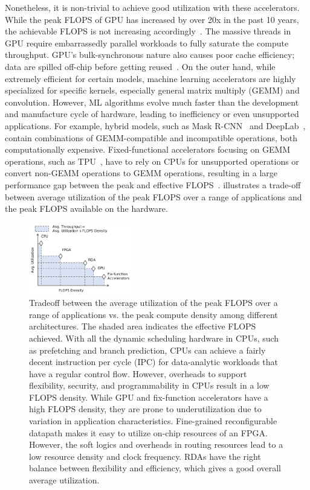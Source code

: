 Nonetheless, it is non-trivial to achieve good utilization with these accelerators.
While the peak FLOPS of GPU has increased by over 20x in the past 10 years, the achievable FLOPS is
not increasing accordingly~\cite{floptrend, gpuperfana}.
The massive threads in GPU require embarrassedly parallel workloads to fully saturate the compute
throughput. GPU's bulk-synchronous nature also causes poor cache efficiency; data are spilled
off-chip before getting reused~\cite{gpuinefficiency}.
On the outer hand, 
while extremely efficient for certain models, machine learning accelerators are highly
specialized for specific kernels, especially general matrix multiply (GEMM) and convolution.
However, ML algorithms evolve much faster than the development and manufacture cycle of hardware, 
leading to inefficiency or even unsupported applications.
For example, hybrid models, such as Mask R-CNN~\cite{maskrcnn} and DeepLab~\cite{deeplab}, contain
combinations of GEMM-compatible and incompatible operations, both computationally expensive.
Fixed-functional accelerators focusing on GEMM operations, such as TPU~\cite{tpu}, 
have to rely on CPUs for unsupported operations or
convert non-GEMM operations to GEMM operations, resulting in a large performance gap between the
peak and effective FLOPS~\cite{effflexdnnaccel}.
 illustrates a trade-off between average utilization of the peak FLOPS over a range
of applications and the peak FLOPS available on the hardware.

\begin{figure}
\centering
\includegraphics[width=0.4\textwidth]{figs/peakutil.pdf}
\caption[Average utilization vs. peak compute density trade-off]{
 Tradeoff between the average utilization of the peak FLOPS over a range of applications vs. the peak compute density 
 among different architectures.
 The shaded area indicates the effective FLOPS achieved.
 With all the dynamic scheduling hardware in CPUs, such as prefetching and branch prediction, 
 CPUs can achieve a fairly decent instruction per cycle (IPC) for data-analytic workloads that have a 
 regular control flow. 
 However, overheads to support flexibility, security, and programmability in CPUs result in a low FLOPS
 density. 
 While GPU and fix-function accelerators have a high FLOPS density, they are prone to
 underutilization due to variation in application characteristics. 
 Fine-grained reconfigurable datapath makes it easy to utilize on-chip resources of an FPGA.
 However, the soft logics and overheads in routing resources lead to a low resource density and clock frequency.
 RDAs have the right balance between flexibility and efficiency, which gives a good overall average utilization.
}
\label{fig:peakutil}
\end{figure}

